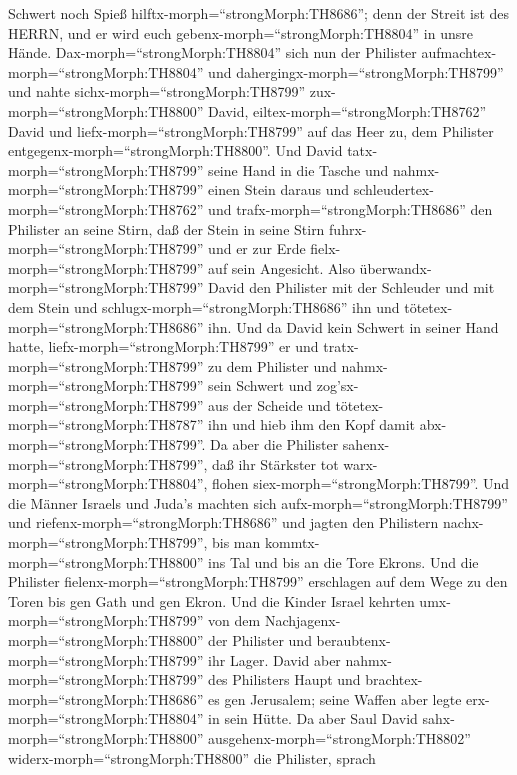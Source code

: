Schwert noch Spieß hilftx-morph=``strongMorph:TH8686''; denn der Streit
ist des HERRN, und er wird euch gebenx-morph=``strongMorph:TH8804'' in
unsre Hände.  Dax-morph=``strongMorph:TH8804'' sich nun der
Philister aufmachtex-morph=``strongMorph:TH8804'' und
dahergingx-morph=``strongMorph:TH8799'' und nahte
sichx-morph=``strongMorph:TH8799'' zux-morph=``strongMorph:TH8800''
David, eiltex-morph=``strongMorph:TH8762'' David und
liefx-morph=``strongMorph:TH8799'' auf das Heer zu, dem Philister
entgegenx-morph=``strongMorph:TH8800''.  Und David
tatx-morph=``strongMorph:TH8799'' seine Hand in die Tasche und
nahmx-morph=``strongMorph:TH8799'' einen Stein daraus und
schleudertex-morph=``strongMorph:TH8762'' und
trafx-morph=``strongMorph:TH8686'' den Philister an seine Stirn, daß der
Stein in seine Stirn fuhrx-morph=``strongMorph:TH8799'' und er zur Erde
fielx-morph=``strongMorph:TH8799'' auf sein Angesicht. 
Also überwandx-morph=``strongMorph:TH8799'' David den Philister mit der
Schleuder und mit dem Stein und schlugx-morph=``strongMorph:TH8686'' ihn
und tötetex-morph=``strongMorph:TH8686'' ihn. Und da David kein Schwert
in seiner Hand hatte,  liefx-morph=``strongMorph:TH8799''
er und tratx-morph=``strongMorph:TH8799'' zu dem Philister und
nahmx-morph=``strongMorph:TH8799'' sein Schwert und
zog'sx-morph=``strongMorph:TH8799'' aus der Scheide und
tötetex-morph=``strongMorph:TH8787'' ihn und hieb ihm den Kopf damit
abx-morph=``strongMorph:TH8799''. Da aber die Philister
sahenx-morph=``strongMorph:TH8799'', daß ihr Stärkster tot
warx-morph=``strongMorph:TH8804'', flohen
siex-morph=``strongMorph:TH8799''.  Und die Männer Israels
und Juda's machten sich aufx-morph=``strongMorph:TH8799'' und
riefenx-morph=``strongMorph:TH8686'' und jagten den Philistern
nachx-morph=``strongMorph:TH8799'', bis man
kommtx-morph=``strongMorph:TH8800'' ins Tal und bis an die Tore Ekrons.
Und die Philister fielenx-morph=``strongMorph:TH8799'' erschlagen auf
dem Wege zu den Toren bis gen Gath und gen Ekron.  Und die
Kinder Israel kehrten umx-morph=``strongMorph:TH8799'' von dem
Nachjagenx-morph=``strongMorph:TH8800'' der Philister und
beraubtenx-morph=``strongMorph:TH8799'' ihr Lager.  David
aber nahmx-morph=``strongMorph:TH8799'' des Philisters Haupt und
brachtex-morph=``strongMorph:TH8686'' es gen Jerusalem; seine Waffen
aber legte erx-morph=``strongMorph:TH8804'' in sein Hütte. 
Da aber Saul David sahx-morph=``strongMorph:TH8800''
ausgehenx-morph=``strongMorph:TH8802''
widerx-morph=``strongMorph:TH8800'' die Philister, sprach
